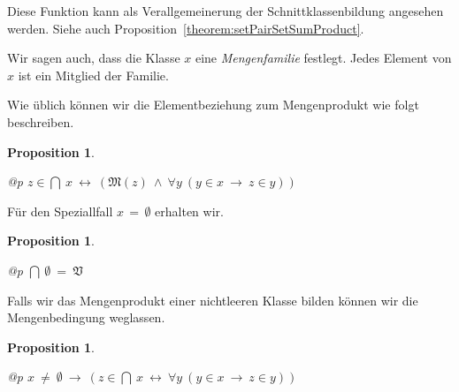 \documentclass[a4paper,german,10pt,twoside]{book}
\newtheorem{prop}[thm]{Proposition}
\theoremstyle{definition}
\theoremstyle{remark}
\begin{document}
Diese Funktion kann als Verallgemeinerung der Schnittklassenbildung angesehen werden.
Siehe auch Proposition~\ref{theorem:setPairSetSumProduct}.

\par
Wir sagen auch, dass die Klasse $x$ eine \emph{Mengenfamilie}
festlegt. Jedes Element von $x$ ist ein Mitglied der Familie.


\par
Wie {\"u}blich k{\"o}nnen wir die Elementbeziehung zum Mengenprodukt wie folgt beschreiben.

\begin{prop}
\label{theorem:setProductMembership} \hypertarget{theorem:setProductMembership}{}
\mbox{}
\begin{longtable}{{@{\extracolsep{\fill}}p{\linewidth}}}
\centering $z \in \bigcap \ x\ \leftrightarrow \ (\mathfrak{M}(z)\ \land \ \forall y\ (y \in x\ \rightarrow \ z \in y))$
\end{longtable}

\end{prop}




\par
F{\"u}r den Speziallfall $x\,=\,\emptyset$ erhalten wir.

\begin{prop}
\label{theorem:emptySetProduct} \hypertarget{theorem:emptySetProduct}{}
\mbox{}
\begin{longtable}{{@{\extracolsep{\fill}}p{\linewidth}}}
\centering $\bigcap \ \emptyset \ =  \ \mathfrak{V}$
\end{longtable}

\end{prop}




\par
Falls wir das Mengenprodukt einer nichtleeren Klasse bilden
k{\"o}nnen wir die Mengenbedingung weglassen.

\begin{prop}
\label{theorem:nonEmptySetProductMembership} \hypertarget{theorem:nonEmptySetProductMembership}{}
\mbox{}
\begin{longtable}{{@{\extracolsep{\fill}}p{\linewidth}}}
\centering $x \ \neq  \ \emptyset\ \rightarrow \ (z \in \bigcap \ x\ \leftrightarrow \ \forall y\ (y \in x\ \rightarrow \ z \in y))$
\end{longtable}

\end{prop}
\end{document}
